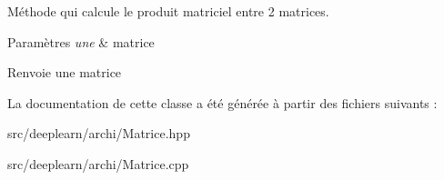 Méthode qui calcule le produit matriciel entre 2 matrices. 


\begin{DoxyParams}{Paramètres}
{\em une} & matrice \\
\hline
\end{DoxyParams}
\begin{DoxyReturn}{Renvoie}
une matrice 
\end{DoxyReturn}


La documentation de cette classe a été générée à partir des fichiers suivants \+:\begin{DoxyCompactItemize}
\item 
src/deeplearn/archi/Matrice.\+hpp\item 
src/deeplearn/archi/Matrice.\+cpp\end{DoxyCompactItemize}
